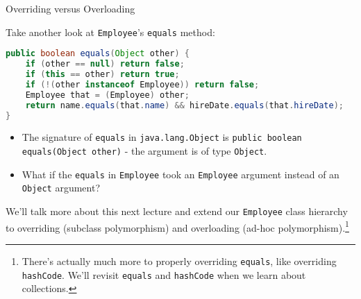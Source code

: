 \documentclass{beamer}
\begin{document}
\begin{frame}[fragile]{Overriding versus Overloading}

\vspace{-.05in}
Take another look at {\tt Employee}'s {\tt equals} method:
\vspace{-.1in}
\begin{lstlisting}[language=Java]
public boolean equals(Object other) {
    if (other == null) return false;
    if (this == other) return true;
    if (!(other instanceof Employee)) return false;
    Employee that = (Employee) other;
    return name.equals(that.name) && hireDate.equals(that.hireDate);
}
\end{lstlisting}
\vspace{-.1in}
\begin{itemize}
\item The signature of {\tt equals} in {\tt java.lang.Object} is {\tt public boolean equals(Object other)} - the argument is of type {\tt Object}.
\item What if the {\tt equals} in {\tt Employee} took an {\tt Employee} argument instead of an {\tt Object} argument?
\end{itemize}

We'll talk more about this next lecture and extend our {\tt Employee} class hierarchy to overriding (subclass polymorphism) and overloading (ad-hoc polymorphism).\footnote{There's actually much more to properly overriding {\tt equals}, like overriding {\tt hashCode}.  We'll revisit {\tt equals} and {\tt hashCode} when we learn about collections.}
\end{frame}





\end{document}
